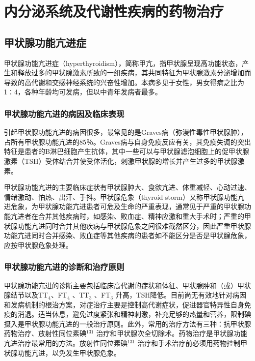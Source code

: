 \chapter{内分泌系统及代谢性疾病的药物治疗}

\section{甲状腺功能亢进症}

甲状腺功能亢进症（hyperthyroidism），简称甲亢，指甲状腺呈现高功能状态，产生和释放过多的甲状腺激素所致的一组疾病，其共同特征为甲状腺激素分泌增加而导致的高代谢和交感神经系统的兴奋性增加。本病多见于女性，男女得病之比为1∶4，各种年龄均可发病，但以中青年发病者最多。

\subsection{甲状腺功能亢进的病因及临床表现}

引起甲状腺功能亢进的病因很多，最常见的是Graves病（弥漫性毒性甲状腺肿），占所有甲状腺功能亢进的85％。Graves病与自身免疫反应有关，其免疫失调的突出特征是患者的B淋巴细胞产生抗体，其中一些可以与甲状腺滤泡细胞上的促甲状腺激素（TSH）受体结合并使受体活化，刺激甲状腺的增长并产生过多的甲状腺激素。

甲状腺功能亢进的主要临床症状有甲状腺肿大、食欲亢进、体重减轻、心动过速、情绪激动、怕热、出汗、手抖。甲状腺危象（thyroid
storm）又称甲状腺功能亢进危象，为甲状腺功能亢进患者可危及生命的严重表现，通常见于严重的甲状腺功能亢进者在合并其他疾病时，如感染、败血症、精神应激和重大手术时；严重的甲状腺功能亢进同时合并其他疾病与甲状腺危象之间很难截然区分，因此严重甲状腺功能亢进同时合并感染、败血症等其他疾病的患者如不能区分是否是甲状腺危象，应按甲状腺危象处理。

\subsection{甲状腺功能亢进的诊断和治疗原则}

甲状腺功能亢进的诊断主要包括临床高代谢的症状和体征、甲状腺肿和（或）甲状腺结节以及TT$_{4}$、FT$_{4}$ 、TT$_{3}$ 、FT$_{3}$
升高，TSH降低。目前尚无有效地针对病因和发病机制的根治方案，对症治疗主要是控制高代谢症状，促进器官特异性自身免疫的消退。适当休息，避免过度紧张和精神刺激，补充足够的热量和营养，限制碘摄入是甲状腺功能亢进的一般治疗原则。此外，常用的治疗方法有三种：抗甲状腺药物治疗、放射性同位素碘$^{131}$
治疗和甲状腺次全切除术。药物治疗是甲状腺功能亢进治疗最常用的方法。放射性同位素碘$^{131}$
治疗和手术治疗前必须用药物控制甲状腺功能亢进，以免发生甲状腺危象。

